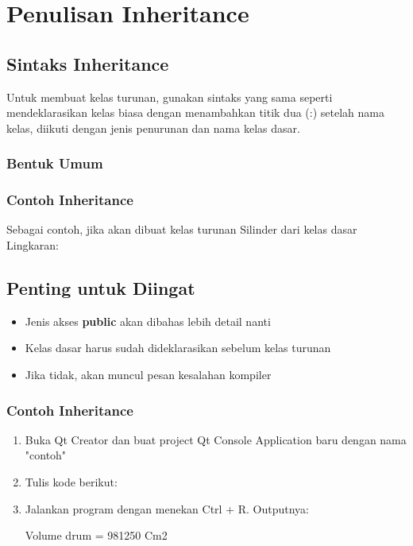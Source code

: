 \section{Penulisan Inheritance}\label{penulisan-penurunan}

\subsection{Sintaks Inheritance}

Untuk membuat kelas turunan, gunakan sintaks yang sama seperti mendeklarasikan kelas biasa dengan menambahkan titik dua (:) setelah nama kelas, diikuti dengan jenis penurunan dan nama kelas dasar.

\subsubsection{Bentuk Umum}



\subsubsection{Contoh Inheritance}

Sebagai contoh, jika akan dibuat kelas turunan Silinder dari kelas dasar Lingkaran:



\subsection{Penting untuk Diingat}

\begin{itemize}
\item Jenis akses \textbf{public} akan dibahas lebih detail nanti
\item Kelas dasar harus sudah dideklarasikan sebelum kelas turunan
\item Jika tidak, akan muncul pesan kesalahan kompiler
\end{itemize}

\subsubsection*{Contoh Inheritance}

\begin{enumerate}
\item Buka Qt Creator dan buat project Qt Console Application baru dengan nama "contoh"
\item Tulis kode berikut:



\item Jalankan program dengan menekan Ctrl + R. Outputnya:

\begin{lcverbatim}
Volume drum = 981250 Cm2
\end{lcverbatim}
\end{enumerate}

